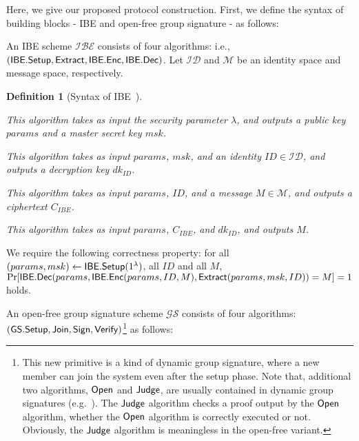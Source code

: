 \documentclass[preprint]{sig-alternate}
\newtheorem{definition}{Definition}[section]
\begin{document}
Here, we give our proposed protocol construction. 
First, we define the syntax of building blocks - IBE and open-free group signature - as follows:

An IBE scheme $\mathcal{IBE}$ consists of four algorithms: i.e., $({\sf IBE.Setup},\allowbreak {\sf Extract}, {\sf IBE.Enc}, {\sf IBE.Dec})$. 
Let $\mathcal{ID}$ and $\mathcal{M}$ be an identity space and message space, respectively. 

\begin{definition}[Syntax of IBE~\cite{[BonehF03]}]~
\begin{description}
\setlength{\itemsep}{0em}\setlength{\parsep}{0em}
\item[{\sf IBE.Setup}:] This algorithm takes as input the security parameter $\lambda$, and outputs a public key $params$ and a master secret key $msk$. 
\item[{\sf Extract}:] This algorithm takes as input $params$, $msk$, and an identity $ID\in\mathcal{ID}$, and outputs a decryption key $dk_{ID}$. 
\item[{\sf IBE.Enc}:] This algorithm takes as input $params$, $ID$, and a message $M\in\mathcal{M}$, and outputs a ciphertext $C_{IBE}$. 
\item[{\sf IBE.Dec}:] This algorithm takes as input $params$, $C_{IBE}$, and $dk_{ID}$, and outputs $M$. 
\end{description}
\end{definition}

\noindent 
We require the following correctness property: for all $(params,\allowbreak msk)\leftarrow{\sf IBE.Setup}(1^\lambda)$, all $ID$ and all $M$, $\Pr[{\sf IBE.Dec}(params,\allowbreak {\sf IBE.Enc}(params,ID,M), {\sf Extract}(params,msk,ID))=M]=1$ holds. 

An open-free group signature scheme $\mathcal{GS}$ consists of four algorithms: $({\sf GS.Setup}, {\sf Join}, {\sf Sign}, {\sf Verify})$\footnote{This new primitive is a kind of dynamic group signature, where a new member can join the system even after the setup phase. Note that, additional two algorithms, ${\sf Open}$ and ${\sf Judge}$, are usually contained in dynamic group signatures (e.g.~\cite{[BellareSZ05]}). 
The ${\sf Judge}$ algorithm checks a proof output by the ${\sf Open}$ algorithm, whether the ${\sf Open}$ algorithm is correctly executed or not. Obviously, the ${\sf Judge}$ algorithm is meaningless in the open-free variant.} as follows: 
\end{document}
